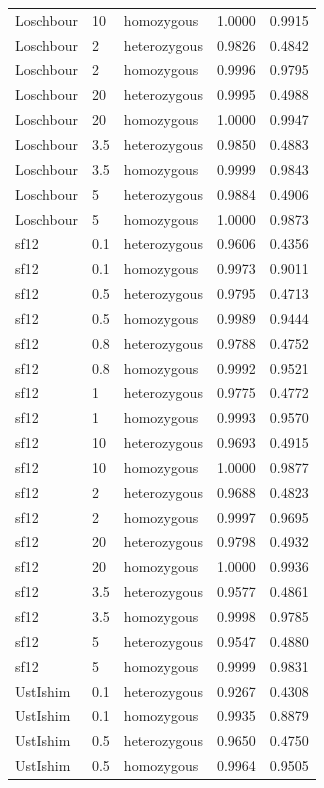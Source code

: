 {\begin{longtable}[t]{lllrr}
Loschbour & 10 & homozygous & 1.0000 & 0.9915\\
Loschbour & 2 & heterozygous & 0.9826 & 0.4842\\
Loschbour & 2 & homozygous & 0.9996 & 0.9795\\
Loschbour & 20 & heterozygous & 0.9995 & 0.4988\\
Loschbour & 20 & homozygous & 1.0000 & 0.9947\\
Loschbour & 3.5 & heterozygous & 0.9850 & 0.4883\\
Loschbour & 3.5 & homozygous & 0.9999 & 0.9843\\
Loschbour & 5 & heterozygous & 0.9884 & 0.4906\\
Loschbour & 5 & homozygous & 1.0000 & 0.9873\\
sf12 & 0.1 & heterozygous & 0.9606 & 0.4356\\
sf12 & 0.1 & homozygous & 0.9973 & 0.9011\\
sf12 & 0.5 & heterozygous & 0.9795 & 0.4713\\
sf12 & 0.5 & homozygous & 0.9989 & 0.9444\\
sf12 & 0.8 & heterozygous & 0.9788 & 0.4752\\
sf12 & 0.8 & homozygous & 0.9992 & 0.9521\\
sf12 & 1 & heterozygous & 0.9775 & 0.4772\\
sf12 & 1 & homozygous & 0.9993 & 0.9570\\
sf12 & 10 & heterozygous & 0.9693 & 0.4915\\
sf12 & 10 & homozygous & 1.0000 & 0.9877\\
sf12 & 2 & heterozygous & 0.9688 & 0.4823\\
sf12 & 2 & homozygous & 0.9997 & 0.9695\\
sf12 & 20 & heterozygous & 0.9798 & 0.4932\\
sf12 & 20 & homozygous & 1.0000 & 0.9936\\
sf12 & 3.5 & heterozygous & 0.9577 & 0.4861\\
sf12 & 3.5 & homozygous & 0.9998 & 0.9785\\
sf12 & 5 & heterozygous & 0.9547 & 0.4880\\
sf12 & 5 & homozygous & 0.9999 & 0.9831\\
UstIshim & 0.1 & heterozygous & 0.9267 & 0.4308\\
UstIshim & 0.1 & homozygous & 0.9935 & 0.8879\\
UstIshim & 0.5 & heterozygous & 0.9650 & 0.4750\\
UstIshim & 0.5 & homozygous & 0.9964 & 0.9505\\

\end{longtable}}
